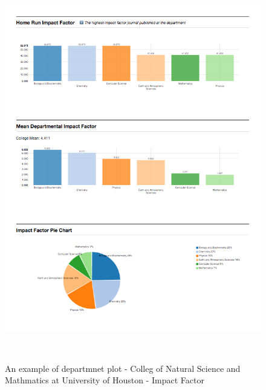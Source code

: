 \begin{figure}
  \centering
  \includegraphics[width=1\textwidth]{figures/Coll-IF}
  \caption{An example of departmnet plot - Colleg of Natural Science and Mathmatics at University of Houston - Impact Factor}~\label{fig:DP-College1}
\end{figure}


